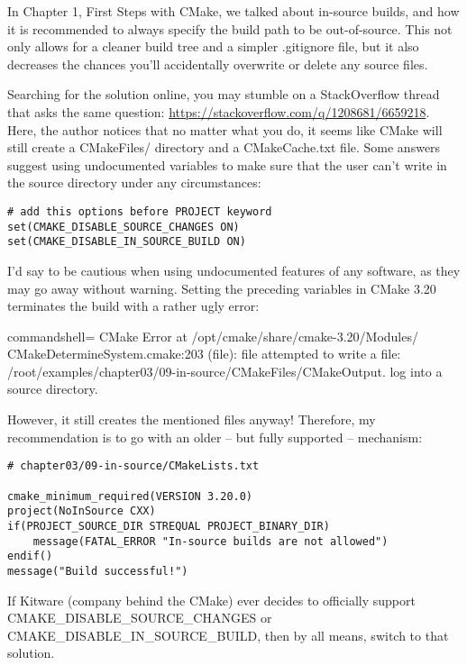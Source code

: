 In Chapter 1, First Steps with CMake, we talked about in-source builds, and how it is recommended to always specify the build path to be out-of-source. This not only allows for a cleaner build tree and a simpler .gitignore file, but it also decreases the chances you'll accidentally overwrite or delete any source files.

Searching for the solution online, you may stumble on a StackOverflow thread that asks the same question: \url{https://stackoverflow.com/q/1208681/6659218}. Here, the author notices that no matter what you do, it seems like CMake will still create a CMakeFiles/ directory and a CMakeCache.txt file. Some answers suggest using undocumented variables to make sure that the user can't write in the source directory under any circumstances:

\begin{lstlisting}[style=styleCMake]
# add this options before PROJECT keyword
set(CMAKE_DISABLE_SOURCE_CHANGES ON)
set(CMAKE_DISABLE_IN_SOURCE_BUILD ON)
\end{lstlisting}

I'd say to be cautious when using undocumented features of any software, as they may go away without warning. Setting the preceding variables in CMake 3.20 terminates the build with a rather ugly error:

\begin{tcblisting}{commandshell={}}
CMake Error at /opt/cmake/share/cmake-3.20/Modules/
CMakeDetermineSystem.cmake:203 (file):
  file attempted to write a file:
  /root/examples/chapter03/09-in-source/CMakeFiles/CMakeOutput.
log into a source
  directory.
\end{tcblisting}

However, it still creates the mentioned files anyway! Therefore, my recommendation is to go with an older – but fully supported – mechanism:

\begin{lstlisting}[style=styleCMake]
# chapter03/09-in-source/CMakeLists.txt

cmake_minimum_required(VERSION 3.20.0)
project(NoInSource CXX)
if(PROJECT_SOURCE_DIR STREQUAL PROJECT_BINARY_DIR)
	message(FATAL_ERROR "In-source builds are not allowed")
endif()
message("Build successful!")
\end{lstlisting}

If Kitware (company behind the CMake) ever decides to officially support CMAKE\_DISABLE\_SOURCE\_CHANGES or CMAKE\_DISABLE\_IN\_SOURCE\_BUILD, then by all means, switch to that solution.














